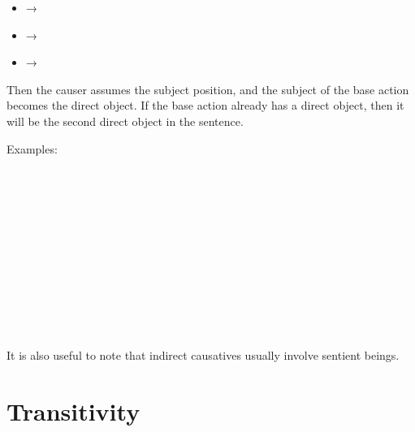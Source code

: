\documentclass{book}
\begin{document}
\begin{itemize}
  \item {} → 
  \item {} → 
  \item {} → 
\end{itemize}

Then the causer assumes the subject position, and the subject of the base action becomes the direct object. If the base action already has a direct object, then it will be the second direct object in the sentence.

Examples: \\
~\\
  \\
  \\
  \\
~\\
    \\
    \\
     \\
~\\
     \\
     \\
     \\

It is also useful to note that indirect causatives usually involve sentient beings.

\section{Transitivity}
\end{document}

